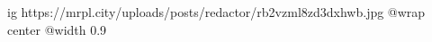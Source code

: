  
 
 
 
 

\ifcmt
  ig https://mrpl.city/uploads/posts/redactor/rb2vzml8zd3dxhwb.jpg
  @wrap center
  @width 0.9
\fi
